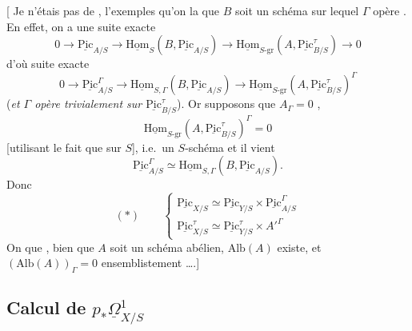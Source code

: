 \documentclass[11pt,a4paper]{article}
\begin{document}
[ Je n'étais pas  de \ill{}, \ill{} l'exemples qu'on \ill{} la \ill{} que $B$ soit un schéma \ill{} sur lequel $\Gamma$ opère  . En effet, on a une suite exacte
\[
0 \to \underline{\mathrm{Pic}}_{A/S} \to \underline{\mathrm{Hom}}_S(B, \underline{\mathrm{Pic}}_{A/S}) \to \underline{\mathrm{Hom}}_{S\text{-gr}}(A, \underline{\mathrm{Pic}}^{\tau}_{B/S}) \to 0
\]
d'où  suite exacte
\[
0 \to \underline{\mathrm{Pic}}_{A/S}^{\Gamma} \to \underline{\mathrm{Hom}}_{S,\Gamma}(B, \underline{\mathrm{Pic}}_{A/S}) \to \underline{\mathrm{Hom}}_{S\text{-gr}}(A, \underline{\mathrm{Pic}}^{\tau}_{B/S})^{\Gamma}
\]
(\emph{et $\Gamma$ opère trivialement sur $\underline{\mathrm{Pic}}^{\tau}_{B/S}$}). Or \struck{\ill{}} supposons que $A_{\Gamma} = 0$ , 
\[
\underline{\mathrm{Hom}}_{S\text{-gr}}(A, \underline{\mathrm{Pic}}^{\tau}_{B/S})^{\Gamma} = 0
\]
[utilisant le fait que \ill{} \ill{} \ill{}  sur $S$], i.e.\ un $S$-schéma \ill{} et il vient
\[
\underline{\mathrm{Pic}}_{A/S}^{\Gamma} \simeq \underline{\mathrm{Hom}}_{S,\Gamma}(B, \underline{\mathrm{Pic}}_{A/S}) .
\]
Donc  
\[
(\ast)\qquad
\begin{cases}
\underline{\mathrm{Pic}}_{X/S} \simeq \underline{\mathrm{Pic}}_{Y/S} \times \underline{\mathrm{Pic}}_{A/S}^{\Gamma} \\
\underline{\mathrm{Pic}}^{\tau}_{X/S} \simeq \underline{\mathrm{Pic}}^{\tau}_{Y/S} \times A'^{\Gamma}
\end{cases}
\]
On   que \ill{} \ill{} \ill{} \ill{}, \ill{} bien que $A$ soit un schéma abélien,  $\mathrm{Alb}(A)$ existe, et $(\mathrm{Alb}(A))_{\Gamma} = 0$ ensemblistement ….]

\subsection{Calcul de $p_*\underline{\Omega}^1_{X/S}$}

\end{document}
